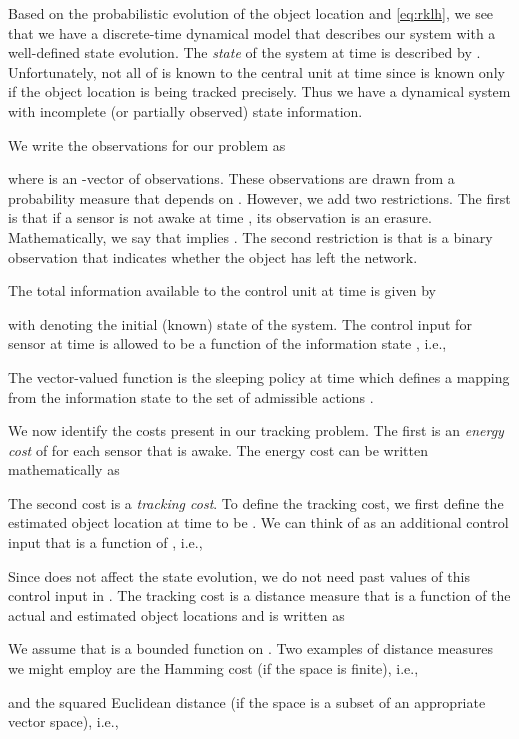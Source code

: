 \documentclass[journal,draftcls,onecolumn,11pt]{IEEEtran}
\begin{document}
Based on the probabilistic evolution of the object location and \eqref{eq:rklh}, we see that we have a discrete-time dynamical model that describes our system with a well-defined state evolution.  The {\em state} of the system at time  is described by . Unfortunately, not all of  is known to the central unit at time  since  is known only if the object location is being tracked precisely.  Thus we have a dynamical system with incomplete (or partially observed) state information.

We write the observations for our problem as

where  is an -vector of observations.  These observations are drawn from a probability measure  that depends on .
However, we add two restrictions.  The first is that if a sensor is not awake at time , its observation is an erasure.  Mathematically, we say that  implies .  The second restriction is that  is a binary observation that indicates whether the object has left the network.

The total information available to the control unit at time  is given by

with  denoting the initial (known) state of the system.
The control input for sensor  at time  is allowed to be a function of the information state , i.e.,

The vector-valued function  is the sleeping policy at time  which defines a mapping from the information state  to the set of admissible actions .

We now identify the costs present in our tracking problem.  The first is an {\em energy cost} of  for each sensor that is awake.  The energy cost can be written mathematically as

The second cost is a {\em tracking cost}.  To define the tracking cost, we first define the estimated object location at time  to be .  We can think of  as an additional control input that is a function of , i.e.,

Since  does not affect the state evolution, we do not need past values of this control input in .  The tracking cost is a distance measure that is a function of the actual and estimated object locations and is written as

We assume that  is a bounded function on .  Two examples of distance measures we might employ are the Hamming cost (if the space  is finite), i.e.,

and the squared Euclidean distance (if the space  is a subset of an appropriate vector space), i.e.,
\end{document}
